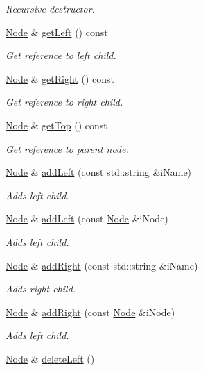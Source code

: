 \begin{DoxyCompactItemize}
\begin{DoxyCompactList}\small\item\em Recursive destructor. \end{DoxyCompactList}\item 
\hyperlink{classnode_1_1Node}{Node} \& \hyperlink{classnode_1_1Node_a77e2492642e7741f301ea12bc943ff79}{get\-Left} () const 
\begin{DoxyCompactList}\small\item\em Get reference to left child. \end{DoxyCompactList}\item 
\hyperlink{classnode_1_1Node}{Node} \& \hyperlink{classnode_1_1Node_a49ca4f8e2c62bfec66bec4ec4be0ce42}{get\-Right} () const 
\begin{DoxyCompactList}\small\item\em Get reference to right child. \end{DoxyCompactList}\item 
\hyperlink{classnode_1_1Node}{Node} \& \hyperlink{classnode_1_1Node_ad9daef61614061d0d2d7da0dfd425ff1}{get\-Top} () const 
\begin{DoxyCompactList}\small\item\em Get reference to parent node. \end{DoxyCompactList}\item 
\hyperlink{classnode_1_1Node}{Node} \& \hyperlink{classnode_1_1Node_ae31c4cd9619b2c968631bf58c915233f}{add\-Left} (const std\-::string \&i\-Name)
\begin{DoxyCompactList}\small\item\em Adds left child. \end{DoxyCompactList}\item 
\hyperlink{classnode_1_1Node}{Node} \& \hyperlink{classnode_1_1Node_a853bb602104e4e65d0d17e1a38dcfb94}{add\-Left} (const \hyperlink{classnode_1_1Node}{Node} \&i\-Node)
\begin{DoxyCompactList}\small\item\em Adds left child. \end{DoxyCompactList}\item 
\hyperlink{classnode_1_1Node}{Node} \& \hyperlink{classnode_1_1Node_a8a676071ac063cf27a13bcdd316a673b}{add\-Right} (const std\-::string \&i\-Name)
\begin{DoxyCompactList}\small\item\em Adds right child. \end{DoxyCompactList}\item 
\hyperlink{classnode_1_1Node}{Node} \& \hyperlink{classnode_1_1Node_a85be9468caa1a9f8e7976e5f30166b8d}{add\-Right} (const \hyperlink{classnode_1_1Node}{Node} \&i\-Node)
\begin{DoxyCompactList}\small\item\em Adds left child. \end{DoxyCompactList}\item 
\hypertarget{classnode_1_1Node_adaff3f88360e19f705fa729aea7adb43}{\hyperlink{classnode_1_1Node}{Node} \& \hyperlink{classnode_1_1Node_adaff3f88360e19f705fa729aea7adb43}{delete\-Left} ()}\label{classnode_1_1Node_adaff3f88360e19f705fa729aea7adb43}


\end{DoxyCompactItemize}
